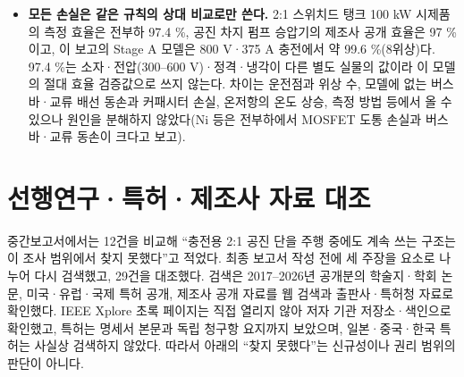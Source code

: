\begin{itemize}
\item \textbf{모든 손실은 같은 규칙의 상대 비교로만 쓴다.} 2:1 스위치드 탱크 100 kW 시제품의 측정 효율은 전부하 97.4 \%\cite{b3}, 공진 차지 펌프 승압기의 제조사 공개 효율은 97 \%\cite{b26}이고, 이 보고의 Stage A 모델은 800 V·375 A 충전에서 약 99.6 \%(8위상)다. 97.4 \%는 소자·전압(300–600 V)·정격·냉각이 다른 별도 실물의 값이라 이 모델의 절대 효율 검증값으로 쓰지 않는다. 차이는 운전점과 위상 수, 모델에 없는 버스바·교류 배선 동손과 커패시터 손실, 온저항의 온도 상승, 측정 방법 등에서 올 수 있으나 원인을 분해하지 않았다(Ni 등은 전부하에서 MOSFET 도통 손실과 버스바·교류 동손이 크다고 보고\cite{b3}).
\end{itemize}

\section{선행연구·특허·제조사 자료 대조}

중간보고서에서는 12건을 비교해 “충전용 2:1 공진 단을 주행 중에도 계속 쓰는 구조는 이 조사 범위에서 찾지 못했다”고 적었다. 최종 보고서 작성 전에 세 주장을 요소로 나누어 다시 검색했고, 29건을 대조했다. 검색은 2017–2026년 공개분의 학술지·학회 논문, 미국·유럽·국제 특허 공개, 제조사 공개 자료를 웹 검색과 출판사·특허청 자료로 확인했다. IEEE Xplore 초록 페이지는 직접 열리지 않아 저자 기관 저장소·색인으로 확인했고, 특허는 명세서 본문과 독립 청구항 요지까지 보았으며, 일본·중국·한국 특허는 사실상 검색하지 않았다. 따라서 아래의 “찾지 못했다”는 신규성이나 권리 범위의 판단이 아니다.

